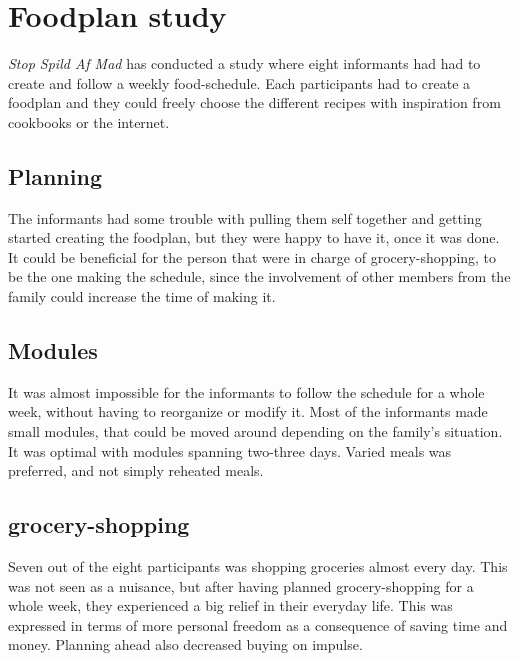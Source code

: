 \section{Foodplan study}
\textit{Stop Spild Af Mad}\cite{madSpild_RapportAdfaerd} has conducted a study where eight informants had had to create and follow a weekly food-schedule.
Each participants had to create a foodplan and they could freely choose the different recipes with inspiration from cookbooks or the internet.

\subsection*{Planning}
The informants had some trouble with pulling them self together and getting started creating the foodplan, but they were happy to have it, once it was done. It could be beneficial for the person that were in charge of grocery-shopping, to be the one making the schedule, since the involvement of other members from the family could increase the time of making it.

\subsection*{Modules}
It was almost impossible for the informants to follow the schedule for a whole week, without having to reorganize or modify it. Most of the informants made small modules, that could be moved around depending on the family's situation. It was optimal with modules spanning two-three days. Varied meals was preferred, and not simply reheated meals.

\subsection*{grocery-shopping}
Seven out of the eight participants was shopping groceries almost every day. This was not seen as a nuisance, but after having planned grocery-shopping for a whole week, they experienced a big relief in their everyday life. This was expressed in terms of more personal freedom as a consequence of saving time and money. Planning ahead also decreased buying on impulse.

